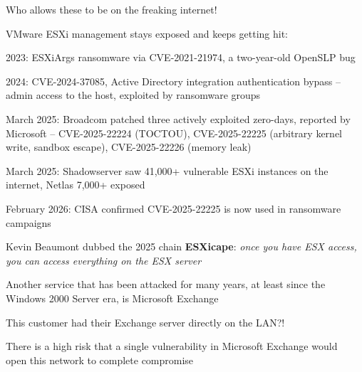 \documentclass[Screen16to9,17pt]{foils}
\begin{document}
\begin{list2}
\item Who allows these to be on the freaking internet!
\end{list2}



VMware ESXi management stays exposed and keeps getting hit:

\begin{list2}
\item 2023: ESXiArgs ransomware via CVE-2021-21974, a two-year-old OpenSLP bug
\item 2024: CVE-2024-37085, Active Directory integration authentication bypass -- admin access to the host, exploited by ransomware groups
\item March 2025: Broadcom patched three actively exploited zero-days, reported by Microsoft -- CVE-2025-22224 (TOCTOU), CVE-2025-22225 (arbitrary kernel write, sandbox escape), CVE-2025-22226 (memory leak)
\item March 2025: Shadowserver saw 41,000+ vulnerable ESXi instances on the internet, Netlas 7,000+ exposed
\item February 2026: CISA confirmed CVE-2025-22225 is now used in ransomware campaigns
\end{list2}

Kevin Beaumont dubbed the 2025 chain {\bf ESXicape}: \emph{once you have ESX access, you can access everything on the ESX server}\\
{\footnotesize{}}




Another service that has been attacked for many years, at least since the Windows 2000 Server era, is Microsoft Exchange

This customer had their Exchange server directly on the LAN?!

\begin{list2}
\item There is a high risk that a single vulnerability in Microsoft Exchange would \\
open this network to complete compromise
\end{list2}


\end{document}
